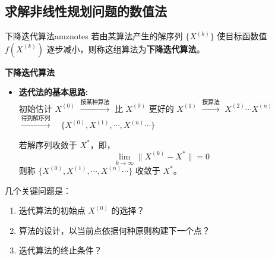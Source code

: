 \subsection{求解非线性规划问题的数值法}

\begin{dfnbox}{下降迭代算法}{amznotes}
    若由某算法产生的解序列 $\{ X^{(k)} \}$ 使目标函数值 $f(X^{(k)})$ 逐步减小，则称这组算法为\textbf{下降迭代算法}。
\end{dfnbox}

\begin{notebox}{\textbf{下降迭代算法}}{}
    \begin{itemize}
        \item \textbf{迭代法的基本思路:}
        \\
        初始估计 $X^{(0)}$ \quad $\xrightarrow{\text{按某种算法}}$ \quad 比 $X^{(0)}$ 更好的 $X^{(1)}$ \quad $\xrightarrow{\text{按算法}}$ \quad $X^{(2)} \cdots X^{(n)}$
        $\xrightarrow{\text{得到解序列}} \quad \{ X^{(0)}, X^{(1)}, \cdots, X^{(n)} \cdots \}$
    
        \bigskip
        若解序列收敛于 $X^*$，即，
        \[
        \lim_{k \to \infty} \| X^{(k)} - X^* \| = 0
        \]
        则称 $\{ X^{(0)}, X^{(1)}, \cdots, X^{(n)} \cdots \}$ 收敛于 $X^*$。
        \\
    \end{itemize}
\end{notebox}
几个关键问题是：
\begin{enumerate}
    \item 迭代算法的初始点 $X^{(0)}$ 的选择？
    \item 算法的设计，以当前点依据何种原则构建下一个点？
    \item 迭代算法的终止条件？
\end{enumerate}

